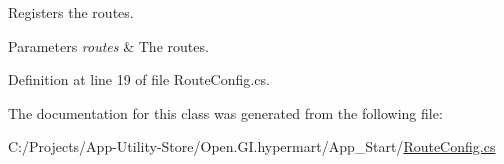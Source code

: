 Registers the routes. 


\begin{DoxyParams}{Parameters}
{\em routes} & The routes.\\
\hline
\end{DoxyParams}


Definition at line 19 of file Route\+Config.\+cs.



The documentation for this class was generated from the following file\+:\begin{DoxyCompactItemize}
\item 
C\+:/\+Projects/\+App-\/\+Utility-\/\+Store/\+Open.\+G\+I.\+hypermart/\+App\+\_\+\+Start/\hyperlink{_route_config_8cs}{Route\+Config.\+cs}\end{DoxyCompactItemize}
